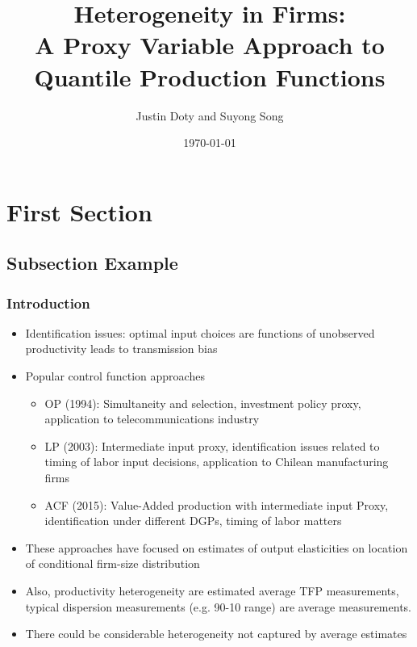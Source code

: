 \documentclass{beamer}
\title[Quantile Production Functions]{Heterogeneity in Firms:\\
A Proxy Variable Approach to Quantile Production Functions}
\author{Justin Doty and Suyong Song} %
\institute[] %
{
\\  
\medskip %
}
\date{\today} %
\begin{document}
\begin{frame}
\titlepage %
\end{frame}


\section{First Section} %

\subsection{Subsection Example} %

\begin{frame}
\frametitle{Introduction}
\begin{itemize}
\item Identification issues: optimal input choices are functions of unobserved productivity leads to transmission bias
\pause
\item Popular control function approaches
\begin{itemize}
	\item OP (1994): Simultaneity and selection, investment policy proxy, application to telecommunications industry
	\item LP (2003): Intermediate input proxy, identification issues related to timing of labor input decisions, application to Chilean manufacturing firms
	\item ACF (2015): Value-Added production with intermediate input Proxy, identification under different DGPs, timing of labor matters
\end{itemize}
\pause
\item These approaches have focused on estimates of output elasticities on location of conditional firm-size distribution
\item Also, productivity heterogeneity are estimated average TFP measurements, typical dispersion measurements (e.g. 90-10 range) are average measurements.
\item There could be considerable heterogeneity not captured by average estimates

\end{itemize}
\end{frame}
\end{document}
